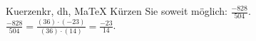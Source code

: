 \begin{MAufgabe}{Kuerzen}{kr, dh, MaTeX}
K\"urzen Sie soweit m\"oglich: $\frac{-828}{504}$.\\ 
\ifLsg\MLoesung
\quad $\frac{-828}{504}=\frac{(36)\cdot(-23)}{(36)\cdot(14)}=\frac{-23}{14}$.\else\relax\fi
 \end{MAufgabe}